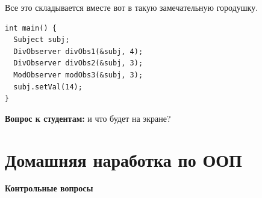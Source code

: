 \documentclass[a4paper,12pt,oneside]{book}
\newif\ifanswers
\begin{document}
Все это складывается вместе вот в такую замечательную городушку.

\begin{lstlisting}
int main() {
  Subject subj;
  DivObserver divObs1(&subj, 4);
  DivObserver divObs2(&subj, 3);
  ModObserver modObs3(&subj, 3);
  subj.setVal(14);
}
\end{lstlisting}

\textbf{Вопрос к студентам:} и что будет на экране?

\ifanswers
Правильный ответ: частное от деления 14 на 4 это 3, на 3 это 4 и в обоих случаях 2 в остатке. Так что 3, 4, 2.
\fi

\pagebreak
\section{Домашняя наработка по ООП}

\textbf{Контрольные вопросы}
\end{document}
